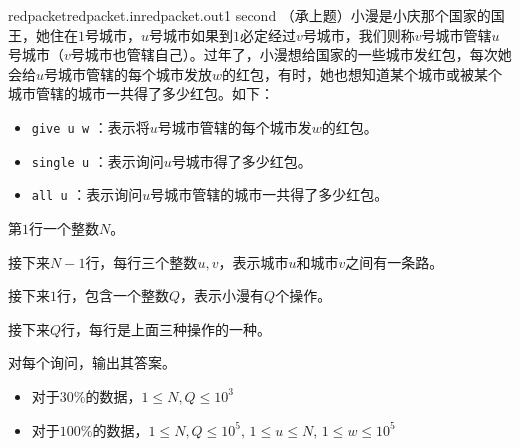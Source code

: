 \documentclass[11pt,a4paper,oneside]{article}
\begin{document}
\begin{problem}{redpacket}{redpacket.in}{redpacket.out}{1 second} 
	（承上题）小漫是小庆那个国家的国王，她住在$1$号城市，$u$号城市如果到$1$必定经过$v$号城市，我们则称$v$号城市管辖$u$号城市（$v$号城市也管辖自己）。过年了，小漫想给国家的一些城市发红包，每次她会给$u$号城市管辖的每个城市发放$w$的红包，有时，她也想知道某个城市或被某个城市管辖的城市一共得了多少红包。如下：
	\begin{itemize}
		\item \texttt{give u w} ：表示将$u$号城市管辖的每个城市发$w$的红包。
		\item \texttt{single u} ：表示询问$u$号城市得了多少红包。
		\item \texttt{all u} ：表示询问$u$号城市管辖的城市一共得了多少红包。
	\end{itemize}
	
	\InputFile
	
	第$1$行一个整数$N$。	
	
	接下来$N-1$行，每行三个整数$u, v$，表示城市$u$和城市$v$之间有一条路。
	
	接下来$1$行，包含一个整数$Q$，表示小漫有$Q$个操作。
	
	接下来$Q$行，每行是上面三种操作的一种。
	
	\OutputFile
	
	对每个询问，输出其答案。
	
	\Example
	
	\begin{example}
\end{example}

\Note

\begin{itemize}
	\item 对于$30\%$的数据，$1 \leq N, Q \leq 10^3$
	\item 对于$100\%$的数据，$1 \leq N, Q \leq 10^5$, $1 \leq u \leq N$, $1 \leq w \leq 10^5$
\end{itemize}

\end{problem}
\end{document}
